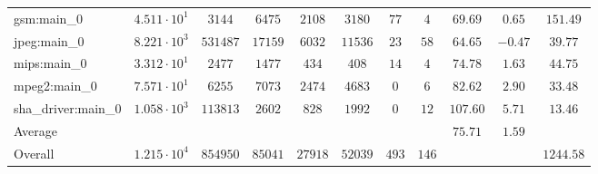 \begin{tabular}{|l|c|c|c|c|c|c|c|c|c|c|}
gsm:main\_0             & $ 4.511 \cdot 10^{1} $ & $ 3144   $ & $ 6475  $ & $ 2108  $ & $ 3180  $ & $ 77  $ & $ 4   $ & $ 69.69       $ & $ 0.65    $ & $ 151.49  $ \\
jpeg:main\_0            & $ 8.221 \cdot 10^{3} $ & $ 531487 $ & $ 17159 $ & $ 6032  $ & $ 11536 $ & $ 23  $ & $ 58  $ & $ 64.65       $ & $ -0.47   $ & $ 39.77   $ \\
mips:main\_0            & $ 3.312 \cdot 10^{1} $ & $ 2477   $ & $ 1477  $ & $ 434   $ & $ 408   $ & $ 14  $ & $ 4   $ & $ 74.78       $ & $ 1.63    $ & $ 44.75   $ \\
mpeg2:main\_0           & $ 7.571 \cdot 10^{1} $ & $ 6255   $ & $ 7073  $ & $ 2474  $ & $ 4683  $ & $ 0   $ & $ 6   $ & $ 82.62       $ & $ 2.90    $ & $ 33.48   $ \\
sha\_driver:main\_0     & $ 1.058 \cdot 10^{3} $ & $ 113813 $ & $ 2602  $ & $ 828   $ & $ 1992  $ & $ 0   $ & $ 12  $ & $ 107.60      $ & $ 5.71    $ & $ 13.46   $ \\
\hline
Average                 & $                    $ & $        $ & $       $ & $       $ & $       $ & $     $ & $     $ & $ 75.71       $ & $ 1.59    $ & $         $ \\
\hline
Overall                 & $ 1.215 \cdot 10^{4} $ & $ 854950 $ & $ 85041 $ & $ 27918 $ & $ 52039 $ & $ 493 $ & $ 146 $ & $             $ & $         $ & $ 1244.58 $ \\
\hline
\end{tabular}
